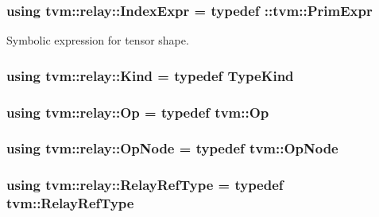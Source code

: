 \subsubsection[{\texorpdfstring{Index\+Expr}{IndexExpr}}]{\setlength{\rightskip}{0pt plus 5cm}using {\bf tvm\+::relay\+::\+Index\+Expr} = typedef \+::{\bf tvm\+::\+Prim\+Expr}}\hypertarget{namespacetvm_1_1relay_ae153a27d81399fd266b8d598227764c4}{}\label{namespacetvm_1_1relay_ae153a27d81399fd266b8d598227764c4}


Symbolic expression for tensor shape. 

\subsubsection[{\texorpdfstring{Kind}{Kind}}]{\setlength{\rightskip}{0pt plus 5cm}using {\bf tvm\+::relay\+::\+Kind} = typedef {\bf Type\+Kind}}\hypertarget{namespacetvm_1_1relay_aa44e35e7d791c8dd53bb00ddb6411b38}{}\label{namespacetvm_1_1relay_aa44e35e7d791c8dd53bb00ddb6411b38}
\subsubsection[{\texorpdfstring{Op}{Op}}]{\setlength{\rightskip}{0pt plus 5cm}using {\bf tvm\+::relay\+::\+Op} = typedef {\bf tvm\+::\+Op}}\hypertarget{namespacetvm_1_1relay_a6c46d15e80f1a9916b8e9c264a185c98}{}\label{namespacetvm_1_1relay_a6c46d15e80f1a9916b8e9c264a185c98}
\subsubsection[{\texorpdfstring{Op\+Node}{OpNode}}]{\setlength{\rightskip}{0pt plus 5cm}using {\bf tvm\+::relay\+::\+Op\+Node} = typedef {\bf tvm\+::\+Op\+Node}}\hypertarget{namespacetvm_1_1relay_ac9d4f2cf78a48659817a88d890e1d142}{}\label{namespacetvm_1_1relay_ac9d4f2cf78a48659817a88d890e1d142}
\subsubsection[{\texorpdfstring{Relay\+Ref\+Type}{RelayRefType}}]{\setlength{\rightskip}{0pt plus 5cm}using {\bf tvm\+::relay\+::\+Relay\+Ref\+Type} = typedef {\bf tvm\+::\+Relay\+Ref\+Type}}\hypertarget{namespacetvm_1_1relay_a13fd39dbc2a639262858e9b72e8fb37f}{}\label{namespacetvm_1_1relay_a13fd39dbc2a639262858e9b72e8fb37f}
